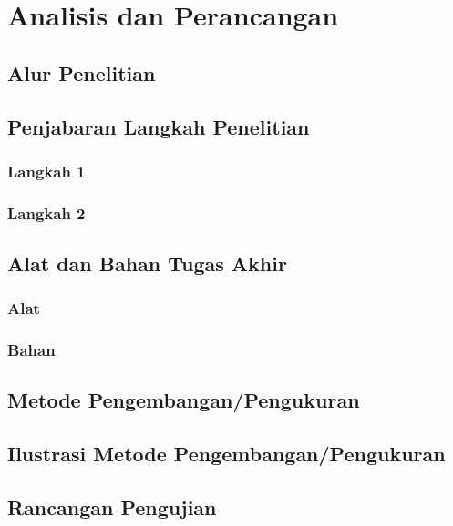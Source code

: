 \newpage
\chapter{Analisis dan Perancangan} \label{Bab III}

\section{Alur Penelitian} \label{III.Alur}

\section{Penjabaran Langkah Penelitian} \label{III.Jabar Alur}

\subsection{Langkah 1} \label{III.Langkah 1}

\subsection{Langkah 2} \label{III.Langkah 2}

\section{Alat dan Bahan Tugas Akhir} \label{III.Alat dan Bahan}

\subsection{Alat} \label{III.Alat}

\subsection{Bahan} \label{III.Bahan}

\section{Metode Pengembangan/Pengukuran} \label{III.Metode}

\section{Ilustrasi Metode Pengembangan/Pengukuran} \label{III.Ilustrasi}

\section{Rancangan Pengujian} \label{III.Rancang Uji}